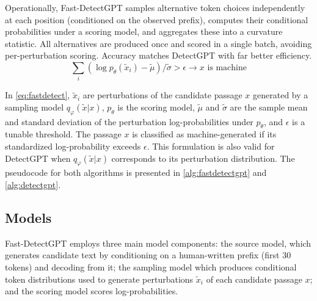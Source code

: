 \documentclass[11pt]{article}
\begin{document}
Operationally, Fast-DetectGPT samples alternative token choices independently at each position (conditioned on the observed prefix), computes their conditional probabilities under a scoring model, and aggregates these into a curvature statistic. All alternatives are produced once and scored in a single batch, avoiding per-perturbation scoring. Accuracy matches DetectGPT with far better efficiency.
\begin{equation}
  \sum_{i} (\log p_\theta (\tilde{x}_i)-\tilde{\mu})/\tilde{\sigma} > \epsilon \rightarrow x \text{ is machine} 
  \label{eq:fastdetect}
\end{equation}

In \cref{eq:fastdetect}, $\tilde{x}_i$ are perturbations of the candidate passage $x$ generated by a sampling model $q_\varphi(\tilde{x}|x)$, $p_\theta$ is the scoring model, $\tilde{\mu}$ and $\tilde{\sigma}$ are the sample mean and standard deviation of the perturbation log-probabilities under $p_\theta$, and $\epsilon$ is a tunable threshold. The passage $x$ is classified as machine-generated if its standardized log-probability exceeds $\epsilon$. This formulation is also valid for DetectGPT when $q_\varphi(\tilde{x}|x)$ corresponds to its perturbation distribution. The pseudocode for both algorithms is presented in \cref{alg:fastdetectgpt} and \cref{alg:detectgpt}.

\subsection{Models}

Fast-DetectGPT employs three main model components: the source model, which generates candidate text by conditioning on a human-written prefix (first 30 tokens) and decoding from it; the sampling model which produces conditional token distributions used to generate perturbations $\tilde{x}_i$ of each candidate passage $x$; and the scoring model scores log-probabilities.
\end{document}
